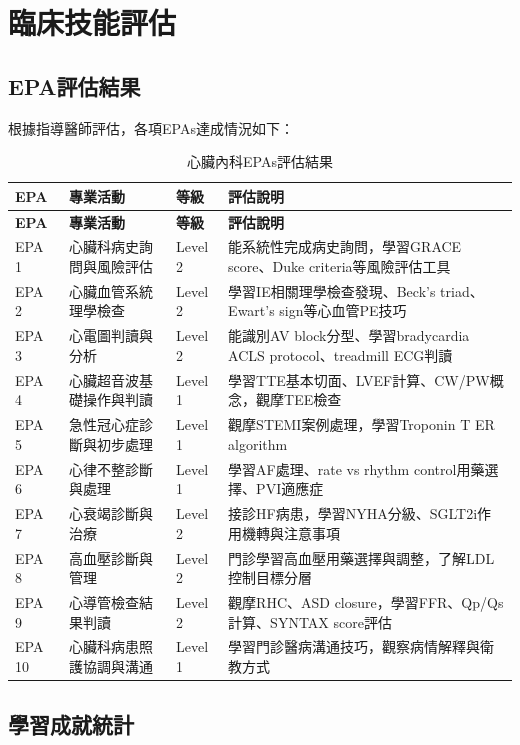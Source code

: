 \documentclass[12pt,a4paper]{article}
\begin{document}
\section{臨床技能評估}

\subsection{EPA評估結果}

根據指導醫師評估，各項EPAs達成情況如下：

\begin{longtable}{|p{1cm}|p{6cm}|p{2cm}|p{5cm}|}
\caption{心臟內科EPAs評估結果} \\
\hline
\textbf{EPA} & \textbf{專業活動} & \textbf{等級} & \textbf{評估說明} \\
\hline
\endfirsthead
\hline
\textbf{EPA} & \textbf{專業活動} & \textbf{等級} & \textbf{評估說明} \\
\hline
\endhead

EPA 1 & 心臟科病史詢問與風險評估 & Level 2 & 能系統性完成病史詢問，學習GRACE score、Duke criteria等風險評估工具 \\
\hline
EPA 2 & 心臟血管系統理學檢查 & Level 2 & 學習IE相關理學檢查發現、Beck's triad、Ewart's sign等心血管PE技巧 \\
\hline  
EPA 3 & 心電圖判讀與分析 & Level 2 & 能識別AV block分型、學習bradycardia ACLS protocol、treadmill ECG判讀 \\
\hline
EPA 4 & 心臟超音波基礎操作與判讀 & Level 1 & 學習TTE基本切面、LVEF計算、CW/PW概念，觀摩TEE檢查 \\
\hline
EPA 5 & 急性冠心症診斷與初步處理 & Level 1 & 觀摩STEMI案例處理，學習Troponin T ER algorithm \\
\hline
EPA 6 & 心律不整診斷與處理 & Level 1 & 學習AF處理、rate vs rhythm control用藥選擇、PVI適應症 \\
\hline
EPA 7 & 心衰竭診斷與治療 & Level 2 & 接診HF病患，學習NYHA分級、SGLT2i作用機轉與注意事項 \\
\hline
EPA 8 & 高血壓診斷與管理 & Level 2 & 門診學習高血壓用藥選擇與調整，了解LDL控制目標分層 \\
\hline
EPA 9 & 心導管檢查結果判讀 & Level 2 & 觀摩RHC、ASD closure，學習FFR、Qp/Qs計算、SYNTAX score評估 \\
\hline
EPA 10 & 心臟科病患照護協調與溝通 & Level 1 & 學習門診醫病溝通技巧，觀察病情解釋與衛教方式 \\
\hline
\end{longtable}

\subsection{學習成就統計}
\end{document}
